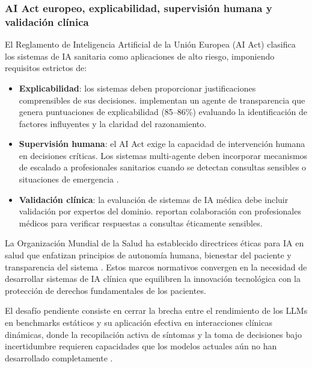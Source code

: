 \subsubsection{AI Act europeo, explicabilidad, supervisión humana y validación clínica}

El Reglamento de Inteligencia Artificial de la Unión Europea (AI Act) clasifica los sistemas de \ac{IA} sanitaria como aplicaciones de alto riesgo, imponiendo requisitos estrictos de:

\begin{itemize}[nosep, leftmargin=*]
    \item \textbf{Explicabilidad}: los sistemas deben proporcionar justificaciones comprensibles de sus decisiones. \textcite{chen2025enhancing} implementan un agente de transparencia que genera puntuaciones de explicabilidad (85--86\%) evaluando la identificación de factores influyentes y la claridad del razonamiento.
    \item \textbf{Supervisión humana}: el AI Act exige la capacidad de intervención humana en decisiones críticas. Los sistemas multi-agente deben incorporar mecanismos de escalado a profesionales sanitarios cuando se detectan consultas sensibles o situaciones de emergencia \parencite{arun2025ethical}.
    \item \textbf{Validación clínica}: la evaluación de sistemas de \ac{IA} médica debe incluir validación por expertos del dominio. \textcite{arun2025ethical} reportan colaboración con profesionales médicos para verificar respuestas a consultas éticamente sensibles.
\end{itemize}

La Organización Mundial de la Salud ha establecido directrices éticas para \ac{IA} en salud que enfatizan principios de autonomía humana, bienestar del paciente y transparencia del sistema \parencite{chen2025enhancing}. Estos marcos normativos convergen en la necesidad de desarrollar sistemas de \ac{IA} clínica que equilibren la innovación tecnológica con la protección de derechos fundamentales de los pacientes.

El desafío pendiente consiste en cerrar la brecha entre el rendimiento de los \ac{LLM}s en benchmarks estáticos y su aplicación efectiva en interacciones clínicas dinámicas, donde la recopilación activa de síntomas y la toma de decisiones bajo incertidumbre requieren capacidades que los modelos actuales aún no han desarrollado completamente \parencite{fan2024aihospital}.
